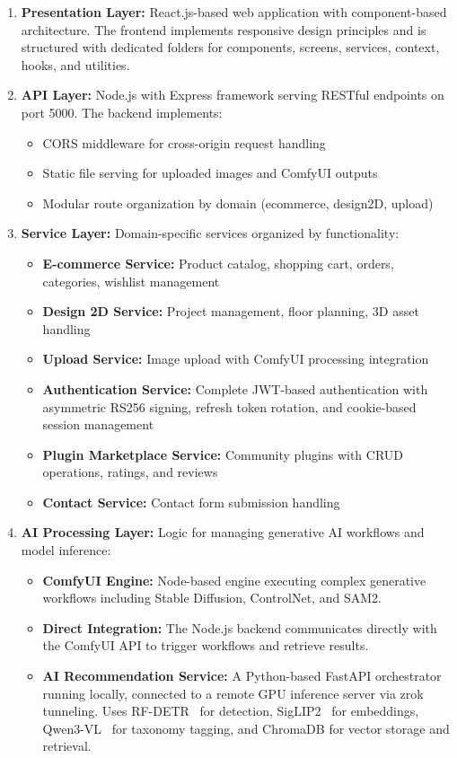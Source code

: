 \begin{enumerate}
    \item \textbf{Presentation Layer:} React.js-based web application with component-based architecture. The frontend implements responsive design principles and is structured with dedicated folders for components, screens, services, context, hooks, and utilities.
    
    \item \textbf{API Layer:} Node.js with Express framework serving RESTful endpoints on port 5000. The backend implements:
    \begin{itemize}
        \item CORS middleware for cross-origin request handling
        \item Static file serving for uploaded images and ComfyUI outputs
        \item Modular route organization by domain (ecommerce, design2D, upload)
    \end{itemize}
    
    \item \textbf{Service Layer:} Domain-specific services organized by functionality:
    \begin{itemize}
        \item \textbf{E-commerce Service:} Product catalog, shopping cart, orders, categories, wishlist management
        \item \textbf{Design 2D Service:} Project management, floor planning, 3D asset handling
        \item \textbf{Upload Service:} Image upload with ComfyUI processing integration
        \item \textbf{Authentication Service:} Complete JWT-based authentication with asymmetric RS256 signing, refresh token rotation, and cookie-based session management
        \item \textbf{Plugin Marketplace Service:} Community plugins with CRUD operations, ratings, and reviews
        \item \textbf{Contact Service:} Contact form submission handling
    \end{itemize}
    
    \item \textbf{AI Processing Layer:} Logic for managing generative AI workflows and model inference:
    \begin{itemize}
        \item \textbf{ComfyUI Engine:} Node-based engine executing complex generative workflows including Stable Diffusion, ControlNet, and SAM2.
        \item \textbf{Direct Integration:} The Node.js backend communicates directly with the ComfyUI API to trigger workflows and retrieve results.
        \item \textbf{AI Recommendation Service:} A Python-based FastAPI orchestrator running locally, connected to a remote GPU inference server via zrok tunneling. Uses RF-DETR~\cite{rfdetr2025} for detection, SigLIP2~\cite{siglip22025} for embeddings, Qwen3-VL~\cite{qwen2024} for taxonomy tagging, and ChromaDB for vector storage and retrieval.
    \end{itemize}
    

\end{enumerate}
